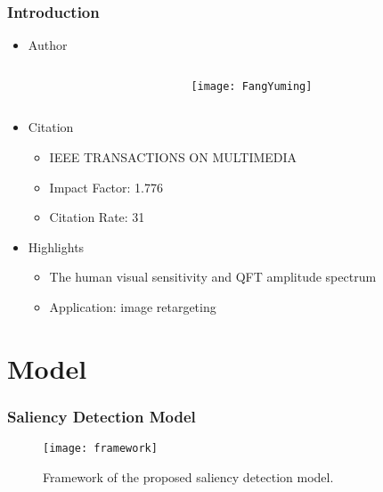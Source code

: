 \documentclass[notheorems,serif,table,compress]{beamer}  %
\begin{document}
\begin{frame}
\frametitle{Introduction}
\begin{itemize}
\item Author
\begin{itemize}
\begin{columns}
\begin{column}{\leftmargini}
\end{column}
\begin{column}{0.5\linewidth}

\begin{figure}
 \texttt{[image: FangYuming]}
\end{figure}

\end{column}
\end{columns}\vspace{1ex}
\end{itemize}

\item Citation
\begin{itemize}
\item IEEE TRANSACTIONS ON MULTIMEDIA
\item Impact Factor: 1.776
\item Citation Rate: 31
\end{itemize}

\item Highlights
\begin{itemize}
\item The human visual sensitivity and QFT amplitude spectrum
\item Application: image retargeting
\end{itemize}
\end{itemize}
\end{frame}

\section{Model}

\begin{frame}
\frametitle{Saliency Detection Model}
\begin{figure}
 \texttt{[image: framework]}
 \caption{Framework of the proposed saliency detection model.}
\end{figure}

\end{frame}
\end{document}
